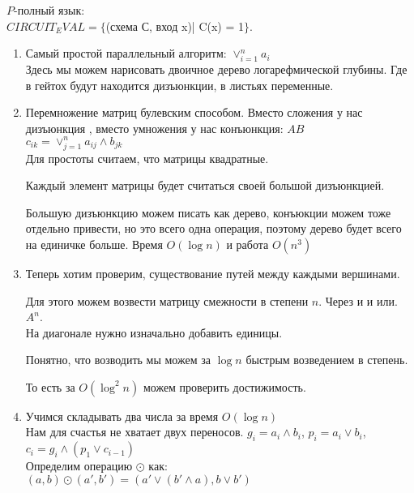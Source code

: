 $P$-полный язык:\\
$CIRCUIT_EVAL = \{$(схема С, вход x)| C(x) = 1$\}$. \\


\begin{exmp}
\begin{enumerate}
\item Самый простой параллельный алгоритм:
$\vee_{i = 1}^{n}a_i$\\

Здесь мы можем нарисовать двоичное дерево логарефмической глубины.
Где в гейтох будут находится дизъюнкции, в листьях переменные.

\item
Перемножение матриц булевским способом. Вместо сложения у нас дизъюнкция
, вместо умножения у нас конъюнкция:
$AB$ \\
$c_{ik} = \vee_{j = 1}^{n}a_{ij}\wedge b_{jk}$\\

Для простоты считаем, что матрицы квадратные. 

Каждый элемент матрицы будет считаться своей большой дизъюнкцией. 

Большую дизъюнкцию можем писать как дерево, конъюкции
можем тоже отдельно привести, но это
всего одна операция, поэтому дерево будет 
всего на единичке больше. Время $O(\log n)$  и работа $O(n^3)$\\

\item 
Теперь хотим проверим, существование путей между каждыми вершинами.

Для этого можем возвести матрицу смежности в степени $n$. Через и и или. 
$A^n$.\\
На диагонале нужно изначально добавить единицы. 

Понятно, что возводить мы можем за $\log n$ быстрым возведением в степень. 

То есть за $O(\log^2n)$  можем проверить достижимость. 

\item 
Учимся складывать два числа за время $O(\log n)$\\

Нам для счастья не хватает двух переносов. $g_i = a_i \wedge b_i$, $p_i = a_i \vee b_i$, $c_i = g_i \wedge (p_1 \vee c_{i - 1})$\\

Определим операцию $\odot$ как:\\
$(a, b) \odot (a', b') = (a' \vee (b' \wedge a), b \vee b')$\\


\end{enumerate}
\end{exmp}
